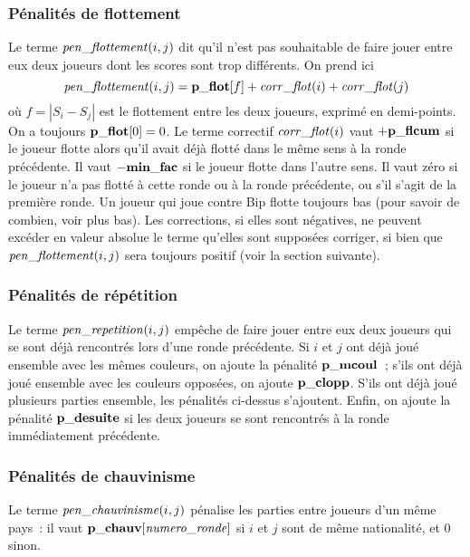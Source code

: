 \documentclass[10pt]{article}
\begin{document}
\subsubsection{P\'enalit\'es de flottement}	
	Le terme ${\it pen\_flottement}(i,j)$ dit qu'il n'est pas
souhaitable de faire jouer entre eux deux joueurs dont les scores sont
trop diff\'erents.  On prend ici
 $${\it pen\_flottement}(i,j) =
    {\bf p\_flot}[f] + {\it corr\_flot}(i) + {\it corr\_flot}(j)
 $$
o\`u $f=\left| S_i-S_j \right|$ est le flottement entre les deux
joueurs, exprim\'e en demi-points.  On a toujours ${\bf p\_flot}[0]=0$.
Le terme correctif ${\it corr\_flot}(i)$ vaut $+{\bf p\_flcum}$ si le
joueur flotte alors qu'il avait d\'ej\`a flott\'e dans le m\^eme sens
\`a la ronde pr\'ec\'edente.  Il vaut $-{\bf min\_fac}$ si le joueur
flotte dans l'autre sens.  Il vaut z\'ero si le joueur n'a pas flott\'e
\`a cette ronde ou \`a la ronde pr\'ec\'edente, ou s'il s'agit de la
premi\`ere ronde.  Un joueur qui joue contre Bip flotte toujours bas
(pour savoir de combien, voir plus bas). Les corrections, si elles sont
n\'egatives, ne peuvent exc\'eder en valeur absolue le terme qu'elles
sont suppos\'ees corriger, si bien que ${\it pen\_flottement}(i,j)$ sera
toujours positif (voir la section suivante).


\subsubsection{P\'enalit\'es de r\'ep\'etition} 	
	Le terme ${\it pen\_repetition}(i,j)$ emp\^eche de faire jouer
entre eux deux joueurs qui se sont d\'ej\`a rencontr\'es lors d'une
ronde pr\'ec\'edente.  Si $i$ et $j$ ont d\'ej\`a jou\'e ensemble avec
les m\^emes couleurs, on ajoute la p\'enalit\'e $\bf p\_mcoul$~; s'ils
ont d\'ej\`a jou\'e ensemble avec les couleurs oppos\'ees, on ajoute
$\bf p\_clopp$.  S'ils ont d\'ej\`a jou\'e plusieurs parties ensemble,
les p\'enalit\'es ci-dessus s'ajoutent.  Enfin, on ajoute la
p\'enalit\'e $\bf p\_desuite$ si les deux joueurs se sont rencontr\'es
\`a la ronde imm\'ediatement pr\'ec\'edente. 


\subsubsection{P\'enalit\'es de chauvinisme}  	
	Le terme ${\it pen\_chauvinisme}(i,j)$ p\'enalise les parties
entre joueurs d'un m\^eme pays~: il vaut ${\bf p\_chauv}[{\it
numero\_ronde}]$ si $i$ et $j$ sont de m\^eme nationalit\'e, et $0$
sinon.
\end{document}
